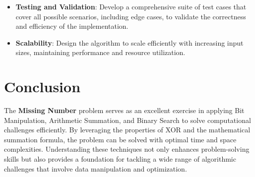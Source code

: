 \begin{itemize}
    \item \textbf{Testing and Validation}: Develop a comprehensive suite of test cases that cover all possible scenarios, including edge cases, to validate the correctness and efficiency of the implementation.
    
    \item \textbf{Scalability}: Design the algorithm to scale efficiently with increasing input sizes, maintaining performance and resource utilization.
\end{itemize}

\section*{Conclusion}

The \textbf{Missing Number} problem serves as an excellent exercise in applying Bit Manipulation, Arithmetic Summation, and Binary Search to solve computational challenges efficiently. By leveraging the properties of XOR and the mathematical summation formula, the problem can be solved with optimal time and space complexities. Understanding these techniques not only enhances problem-solving skills but also provides a foundation for tackling a wide range of algorithmic challenges that involve data manipulation and optimization.

\printindex

% 
% 
% 
% 
% 
% 
% 
% 
